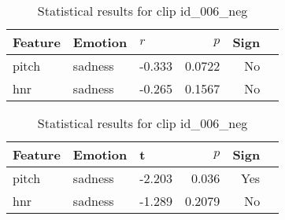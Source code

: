   \begin{table}[H]
    \centering
    \begin{subtable}[t]{0.48\textwidth}
      \centering
      \caption{Clip id\_006\_neg – Pearson Correlation}
      \label{tab:clip006_neg_pearson}
      \begin{tabular}{lllrrl}
        \toprule
        Feature               & Emotion & $r$ & $p$ & Sign \\
        \midrule
        pitch       & sadness    &  -0.333 & 0.0722 & No  \\
        hnr    & sadness    & -0.265 & 0.1567 & No  \\
        \bottomrule
      \end{tabular}
    \end{subtable}
    \hfill
    \begin{subtable}[t]{0.48\textwidth}
      \centering
      \caption{Clip id\_006\_neg – t-test}
      \label{tab:clip006_neg_ttest}
      \begin{tabular}{lllrrl}
        \toprule
        Feature               & Emotion & t & $p$& Sign \\
        \midrule

        pitch       & sadness    &  -2.203 & 0.036 & Yes  \\
        hnr    & sadness    & -1.289 & 0.2079 & No  \\
        \bottomrule
      \end{tabular}
    \end{subtable}
    \caption{Statistical results for clip id\_006\_neg}
    \label{tab:clip006_neg_stats}
  \end{table}